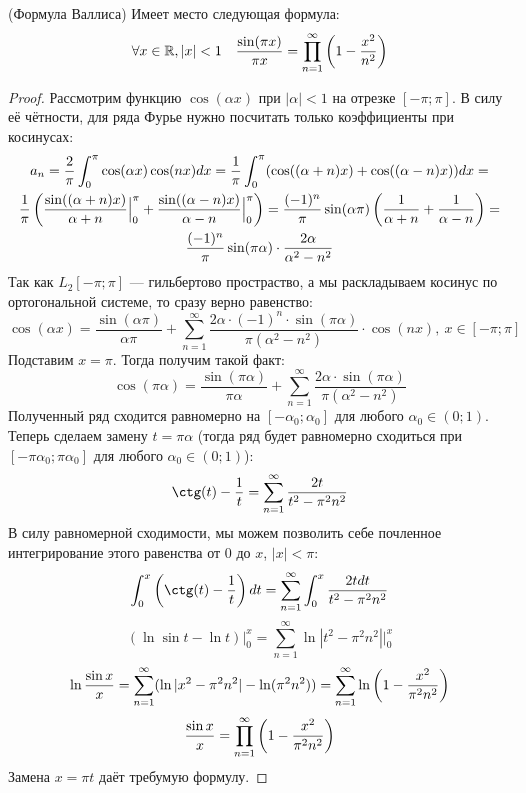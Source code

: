 \begin{theorem} (Формула Валлиса)
	Имеет место следующая формула:
	\[
		\forall x \in \mathbb{R}, |x| < 1 \quad \frac{\sin(\pi x)}{\pi x} = \prod_{n = 1}^\infty \left(1 - \frac{x^2}{n^2}\right)
	\]
\end{theorem}

\begin{proof}
	Рассмотрим функцию $\cos(\alpha x)$ при $|\alpha| < 1$ на отрезке $[-\pi; \pi]$. В силу её чётности, для ряда Фурье нужно посчитать только коэффициенты при косинусах:
	\begin{multline*}
		a_n = \frac{2}{\pi} \int_0^\pi \cos(\alpha x)\cos(nx)dx = \frac{1}{\pi} \int_0^\pi (\cos((\alpha + n)x) + \cos((\alpha - n)x))dx =
		\\
		\frac{1}{\pi}\left(\frac{\sin((\alpha + n)x)}{\alpha + n}\Big|_0^\pi + \frac{\sin((\alpha - n)x)}{\alpha - n}\Big|_0^\pi\right) = \frac{(-1)^n}{\pi} \sin(\alpha \pi) \left(\frac{1}{\alpha + n} + \frac{1}{\alpha - n}\right) =
		\\
		\frac{(-1)^n}{\pi} \sin(\pi\alpha) \cdot \frac{2\alpha}{\alpha^2 - n^2}
	\end{multline*}
	Так как $L_2[-\pi; \pi]$ --- гильбертово простраство, а мы раскладываем косинус по ортогональной системе, то сразу верно равенство:
	\[
		\cos(\alpha x) = \frac{\sin(\alpha \pi)}{\alpha \pi} + \sum_{n = 1}^\infty \frac{2\alpha \cdot (-1)^n \cdot \sin(\pi\alpha)}{\pi(\alpha^2 - n^2)} \cdot \cos(nx),\ x \in [-\pi; \pi]
	\]
	Подставим $x = \pi$. Тогда получим такой факт:
	\[
		\cos(\pi\alpha) = \frac{\sin(\pi\alpha)}{\pi\alpha} + \sum_{n = 1}^\infty \frac{2\alpha \cdot \sin(\pi\alpha)}{\pi(\alpha^2 - n^2)}
	\]
	Полученный ряд сходится равномерно на $[-\alpha_0; \alpha_0]$ для любого $\alpha_0 \in (0; 1)$. Теперь сделаем замену $t = \pi\alpha$ (тогда ряд будет равномерно сходиться при $[-\pi\alpha_0; \pi\alpha_0]$ для любого $\alpha_0 \in (0; 1)$):
	\[
		\ctg(t) - \frac{1}{t} = \sum_{n = 1}^\infty \frac{2t}{t^2 - \pi^2n^2}
	\]
	В силу равномерной сходимости, мы можем позволить себе почленное интегрирование этого равенства от 0 до $x$, $|x| < \pi$:
	\[
		\int_0^x \ps{\ctg(t) - \frac{1}{t}}dt = \sum_{n = 1}^\infty \int_0^x \frac{2tdt}{t^2 - \pi^2n^2}
	\]\[
		(\ln \sin t - \ln t)\Big|_0^x  = \sum_{n = 1}^\infty \ln |t^2 - \pi^2n^2|\Big|_0^x
	\]\[
		\ln \frac{\sin x}{x} = \sum_{n = 1}^\infty (\ln|x^2 - \pi^2n^2| - \ln(\pi^2n^2)) = \sum_{n = 1}^\infty \ln\left(1 - \frac{x^2}{\pi^2n^2}\right)
	\]\[
		\frac{\sin x}{x} = \prod_{n = 1}^\infty \left(1 - \frac{x^2}{\pi^2n^2}\right)
	\]
	Замена $x = \pi t$ даёт требумую формулу.
\end{proof}

